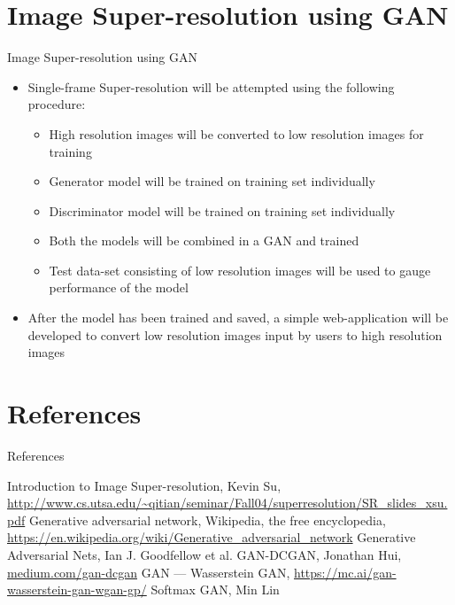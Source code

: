 \documentclass{beamer}
\begin{document}
\section{Image Super-resolution using GAN}
	\begin{frame}{Image Super-resolution using GAN}
		\begin{itemize}
			\item Single-frame Super-resolution will be attempted using the following procedure:
			\begin{itemize}
				\item High resolution images will be converted to low resolution images for training
				\item Generator model will be trained on training set individually
				\item Discriminator model will be trained on training set individually
				\item Both the models will be combined in a GAN and trained
				\item Test data-set consisting of low resolution images will be used to gauge  performance of the model
			\end{itemize}
			\item After the model has been trained and saved, a simple web-application will be developed to convert low resolution images input by users to high resolution images
		\end{itemize}
	\end{frame}

\section{References}
	\begin{frame}{References}
		\begin{thebibliography}{10}
			 Introduction to Image Super-resolution, Kevin Su, \url{http://www.cs.utsa.edu/~qitian/seminar/Fall04/superresolution/SR\_slides\_xsu.pdf}
			 Generative adversarial network, Wikipedia, the free encyclopedia, \url{https://en.wikipedia.org/wiki/Generative_adversarial_network}
			 Generative Adversarial Nets, Ian J. Goodfellow et al.			
			 GAN-DCGAN, Jonathan Hui, \href{https://medium.com/@jonathan_hui/gan-dcgan-deep-convolutional-generative-adversarial-networks-df855c438f}{medium.com/gan-dcgan}
			GAN — Wasserstein GAN, \url{https://mc.ai/gan-wasserstein-gan-wgan-gp/}
			 Softmax GAN, Min Lin
		\end{thebibliography}
	\end{frame}
\end{document}
